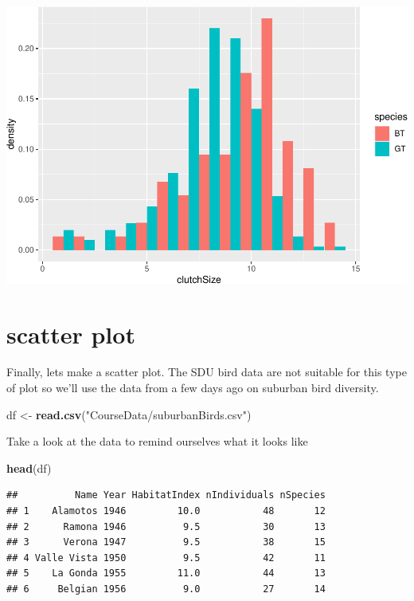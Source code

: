 \documentclass[
  a4paperpaper,
]{book}
\newenvironment{Shaded}{\begin{snugshade}}{\end{snugshade}}
\newcommand{\KeywordTok}[1]{\textcolor[rgb]{0.13,0.29,0.53}{\textbf{#1}}}
\newcommand{\NormalTok}[1]{#1}
\newcommand{\StringTok}[1]{\textcolor[rgb]{0.31,0.60,0.02}{#1}}
\begin{document}
\includegraphics{BB852_files/figure-latex/unnamed-chunk-85-1.pdf}

\hypertarget{scatter-plot}{%
\section{scatter plot}\label{scatter-plot}}

Finally, lets make a scatter plot.
The SDU bird data are not suitable for this type of plot so we'll use the data from a few days ago on suburban bird diversity.

\begin{Shaded}
\begin{Highlighting}[]
\NormalTok{df \textless{}{-}}\StringTok{ }\KeywordTok{read.csv}\NormalTok{(}\StringTok{"CourseData/suburbanBirds.csv"}\NormalTok{)}
\end{Highlighting}
\end{Shaded}

Take a look at the data to remind ourselves what it looks like

\begin{Shaded}
\begin{Highlighting}[]
\KeywordTok{head}\NormalTok{(df)}
\end{Highlighting}
\end{Shaded}

\begin{verbatim}
##          Name Year HabitatIndex nIndividuals nSpecies
## 1    Alamotos 1946         10.0           48       12
## 2      Ramona 1946          9.5           30       13
## 3      Verona 1947          9.5           38       15
## 4 Valle Vista 1950          9.5           42       11
## 5    La Gonda 1955         11.0           44       13
## 6     Belgian 1956          9.0           27       14
\end{verbatim}
\end{document}
